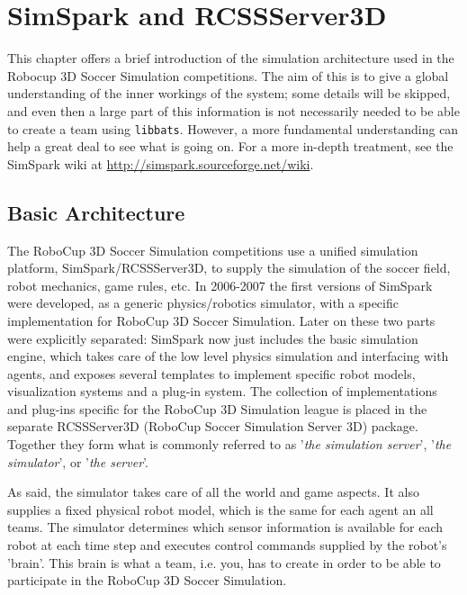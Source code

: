 
\chapter{SimSpark and RCSSServer3D}
\label{chSimspark}

This chapter offers a brief introduction of the simulation
architecture used in the Robocup 3D Soccer Simulation
competitions. The aim of this is to give a global understanding of the
inner workings of the system; some details will be skipped, and even
then a large part of this information is not necessarily needed to be
able to create a team using {\tt libbats}. However, a more fundamental
understanding can help a great deal to see what is going on. For a
more in-depth treatment, see the SimSpark wiki at
\url{http://simspark.sourceforge.net/wiki}.

\section{Basic Architecture}

The RoboCup 3D Soccer Simulation competitions use a unified simulation
platform, SimSpark/RCSSServer3D, to supply the simulation of the
soccer field, robot mechanics, game rules, etc. In 2006-2007 the first
versions of SimSpark were developed, as a generic physics/robotics
simulator, with a specific implementation for RoboCup 3D Soccer
Simulation. Later on these two parts were explicitly separated:
SimSpark now just includes the basic simulation engine, which takes
care of the low level physics simulation and interfacing with agents,
and exposes several templates to implement specific robot models,
visualization systems and a plug-in system. The collection of
implementations and plug-ins specific for the RoboCup 3D Simulation
league is placed in the separate RCSSServer3D (RoboCup Soccer
Simulation Server 3D) package. Together they form what is commonly
referred to as '\emph{the simulation server}', '\emph{the simulator}',
or '\emph{the server}'.

As said, the simulator takes care of all the world and game
aspects. It also supplies a fixed physical robot model, which is the
same for each agent an all teams. The simulator determines which
sensor information is available for each robot at each time step and
executes control commands supplied by the robot's 'brain'. This brain
is what a team, i.e. you, has to create in order to be able to
participate in the RoboCup 3D Soccer Simulation.

